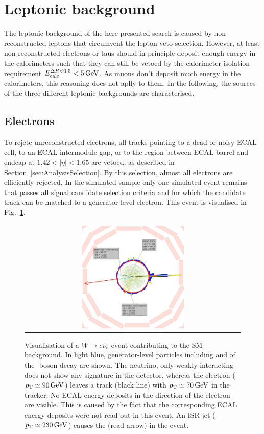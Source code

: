 \section{Leptonic background}
\label{sec:LeptonicBkg}

The leptonic background of the here presented search is caused by non-reconstructed leptons that circumvent the lepton veto selection.
However, at least non-reconstructed electrons or taus should in principle deposit enough energy in the calorimeters such that they can still be vetoed by the calorimeter isolation requirement $E^{\Delta R<0.5}_{\text{calo}}<5\,\text{Ge}\kern-0.06667em\text{V}$.
As muons don't deposit much energy in the calorimeters, this reasoning does not aplly to them.
In the following, the sources of the three different leptonic backgrounds are characterised.

\subsection*{Electrons}
To rejetc unreconstructed electrons, all tracks pointing to a dead or noisy ECAL cell, to an ECAL intermodule gap, or to the region between ECAL barrel and endcap at $1.42<|\eta|<1.65$ are vetoed, 
as described in Section~\ref{sec:AnalysisSelection}.
By this selection, almost all electrons are efficiently rejected.
In the simulated \WJets sample only one simulated event remains that passes all signal candidate selection criteria and for which the candidate track can be matched to a generator-level electron.
This event is visualised in Fig.~\ref{fig:LostElectron}. 
\begin{figure}[!t]
  \centering 
  \begin{tabular}{c}
    \includegraphics[width=0.49\textwidth]{figures/analysis/Electron_lumi_279317_event_111637553.png}
  \end{tabular}
 \caption{Visualisation of a $W\rightarrow e\nu_e$ event contributing to the SM background. 
           In light blue, generator-level particles including \lel and \nue of the \W-boson decay are shown. 
           The neutrino, only weakly interacting does not show any signature in the detector, whereas the electron ($p_{\text{T}}\simeq 90\,\text{Ge}\kern-0.06667em\text{V}$) leaves a track (black line) with \mbox{$p_{\text{T}}\simeq 70\,\text{Ge}\kern-0.06667em\text{V}$} in the tracker. 
           No ECAL energy deposits in the direction of the electron are visible. 
           This is caused by the fact that the corresponding ECAL energy deposits were not read out in this event.
           An ISR jet ($p_{\text{T}}\simeq 230\,\text{Ge}\kern-0.06667em\text{V}$) causes the \met (read arrow) in the event. }
  \label{fig:LostElectron}
\end{figure}
 
